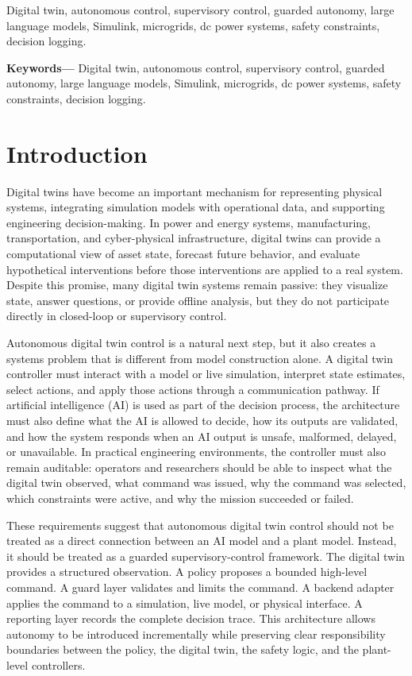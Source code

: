 \documentclass[conference]{IEEEtran}
\begin{document}
\ifieeetran
\begin{IEEEkeywords}
Digital twin, autonomous control, supervisory control, guarded autonomy,
large language models, Simulink, microgrids, dc power systems, safety
constraints, decision logging.
\end{IEEEkeywords}
\else
\noindent\textbf{Keywords---}
Digital twin, autonomous control, supervisory control, guarded autonomy,
large language models, Simulink, microgrids, dc power systems, safety
constraints, decision logging.
\par\medskip
\fi

\section{Introduction}

Digital twins have become an important mechanism for representing physical
systems, integrating simulation models with operational data, and supporting
engineering decision-making. In power and energy systems, manufacturing,
transportation, and cyber-physical infrastructure, digital twins can provide a
computational view of asset state, forecast future behavior, and evaluate
hypothetical interventions before those interventions are applied to a real
system. Despite this promise, many digital twin systems remain passive: they
visualize state, answer questions, or provide offline analysis, but they do not
participate directly in closed-loop or supervisory control.

Autonomous digital twin control is a natural next step, but it also creates a
systems problem that is different from model construction alone. A digital
twin controller must interact with a model or live simulation, interpret state
estimates, select actions, and apply those actions through a communication
pathway. If artificial intelligence (AI) is used as part of the decision
process, the architecture must also define what the AI is allowed to decide,
how its outputs are validated, and how the system responds when an AI output
is unsafe, malformed, delayed, or unavailable. In practical engineering
environments, the controller must also remain auditable: operators and
researchers should be able to inspect what the digital twin observed, what
command was issued, why the command was selected, which constraints were
active, and why the mission succeeded or failed.

These requirements suggest that autonomous digital twin control should not be
treated as a direct connection between an AI model and a plant model. Instead,
it should be treated as a guarded supervisory-control framework. The digital
twin provides a structured observation. A policy proposes a bounded high-level
command. A guard layer validates and limits the command. A backend adapter
applies the command to a simulation, live model, or physical interface. A
reporting layer records the complete decision trace. This architecture allows
autonomy to be introduced incrementally while preserving clear responsibility
boundaries between the policy, the digital twin, the safety logic, and the
plant-level controllers.
\end{document}
